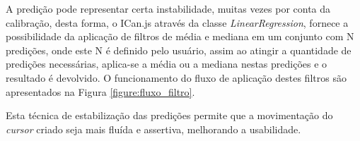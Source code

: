 \par A predição pode representar certa instabilidade, muitas vezes por conta da calibração, desta forma, o ICan.js através da classe \textit{LinearRegression}, fornece a possibilidade da aplicação de filtros de média e mediana em um conjunto com N predições, onde este N é definido pelo usuário, assim ao atingir a quantidade de predições necessárias, aplica-se a média ou a mediana nestas predições e o resultado é devolvido. O funcionamento do fluxo de aplicação destes filtros são apresentados na Figura \ref{figure:fluxo_filtro}.


\par Esta técnica de estabilização das predições permite que a movimentação do \textit{cursor} criado seja mais fluída e assertiva, melhorando a usabilidade.

